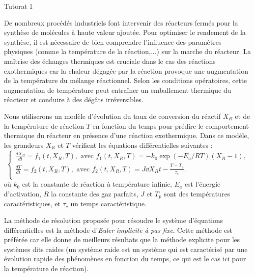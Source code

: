 \begin{exo}[PC][1][python]{Tutorat 1}
    
  

  De nombreux procédés industriels font intervenir des réacteurs fermés pour la synthèse de molécules à haute valeur ajoutée. Pour optimiser le rendement de la synthèse, il est nécessaire de bien comprendre l'influence des paramètres physiques (comme la température de la réaction,...) sur la marche du réacteur. La maîtrise des échanges thermiques est cruciale dans le cas des réactions exothermiques car la chaleur dégagée par la réaction provoque une augmentation de la température du mélange réactionnel. Selon les conditions opératoires, cette augmentation de température peut entraîner un emballement thermique du réacteur et conduire à des dégâts irréversibles.


  Nous utiliserons un modèle d'évolution du taux de conversion du réactif \(X_{R}\) et de la température de réaction \(T\) en fonction du temps pour prédire le comportement thermique du réacteur en présence d'une réaction exothermique. Dans ce modèle, les grandeurs \(X_{R}\) et \(T\) vérifient les équations différentielles suivantes :
\begin{equation}
  \left\{\begin{array}{l}
    \frac{d X_{R}}{d t}=f_{1}\left(t, X_{R}, T\right), \text{ avec } f_1(t,X_R,T) =  -k_0 \exp \left( - E_a / R T\right) \left(X_R-1\right), \\[0.3cm]
    \frac{d T}{d t}=f_{2}\left(t, X_{R}, T\right), \text{ avec } f_2(t,X_R,T) =  J \dd{X_R}{t}-\frac{T-T_p}{\tau_c}. \\[0.3cm]
  \end{array}\right.
\end{equation}
où $k_0$ est la constante de réaction à température infinie, $E_a$ est l'énergie d'activation, $R$ la constante des gaz parfaits, $J$ et $T_p$ sont des températures caractéristiques, et $\tau_c$ un temps caractéristique.


La méthode de résolution proposée pour résoudre le système d'équations différentielles est la méthode d'\emph{Euler implicite à pas fixe}. Cette méthode est préférée car elle donne de meilleurs résultats que la méthode explicite pour les systèmes dits raides (un système raide est un système qui est caractérisé par une évolution rapide des phénomènes en fonction du temps, ce qui est le cas ici pour la température de réaction).


\end{exo}
